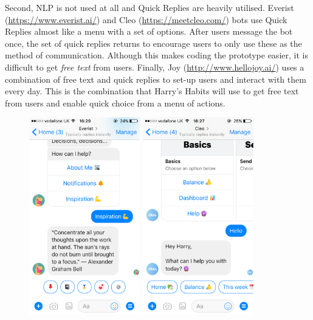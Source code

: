 Second, NLP is not used at all and Quick Replies are heavily utilised. Everist (\url{https://www.everist.ai/}) and Cleo (\url{https://meetcleo.com/}) bots use Quick Replies almost like a menu with a set of options. After users message the bot once, the set of quick replies returns to encourage users to only use these as the method of communication. Although this makes coding the prototype easier, it is difficult to get \textit{free text} from users. Finally, Joy (\url{http://www.hellojoy.ai/}) uses a combination of free text and quick replies to set-up users and interact with them every day. This is the combination that Harry's Habits will use to get free text from users and enable quick choice from a menu of actions.

\begin{figure}[H]
  \centering
  \includegraphics[width=1.9in]{../resources/existing-bots/everist.png}
  \hspace{10px}
  \includegraphics[width=1.9in]{../resources/existing-bots/cleo.png}

\end{figure}
